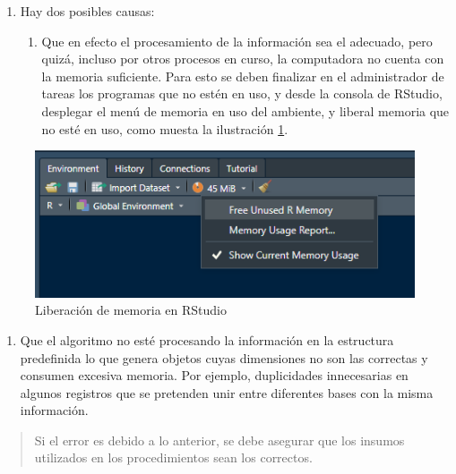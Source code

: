 \documentclass[
]{article}
\providecommand{\tightlist}{%
  \setlength{\itemsep}{0pt}\setlength{\parskip}{0pt}}
\begin{document}
\begin{enumerate}
\begin{enumerate}
\begin{enumerate}
      \begin{enumerate}
      \def\labelenumiv{\arabic{enumiv}.}
      \item
        Hay dos posibles causas:

        \begin{enumerate}
        \def\labelenumv{\alph{enumv}.}
        \tightlist
        \item
          Que en efecto el procesamiento de la información sea el adecuado, pero quizá, incluso por otros procesos en curso, la computadora no cuenta con la memoria suficiente. Para esto se deben finalizar en el administrador de tareas los programas que no estén en uso, y desde la consola de RStudio, desplegar el menú de memoria en uso del ambiente, y liberal memoria que no esté en uso, como muesta la ilustración \ref{fig:memoriaRstudio}.
        \end{enumerate}
      \end{enumerate}
    \end{enumerate}
  \end{enumerate}
\end{enumerate}

\begin{figure}
\includegraphics[width=6.33in]{images-1/06/memoriaR} \caption{Liberación de memoria en RStudio}\label{fig:memoriaRstudio}
\end{figure}

\begin{enumerate}
\def\labelenumi{\alph{enumi}.}
\setcounter{enumi}{1}
\tightlist
\item
  Que el algoritmo no esté procesando la información en la estructura predefinida lo que genera objetos cuyas dimensiones no son las correctas y consumen excesiva memoria. Por ejemplo, duplicidades innecesarias en algunos registros que se pretenden unir entre diferentes bases con la misma información.
\end{enumerate}

\begin{quote}
Si el error es debido a lo anterior, se debe asegurar que los insumos utilizados en los procedimientos sean los correctos.
\end{quote}
\end{document}
